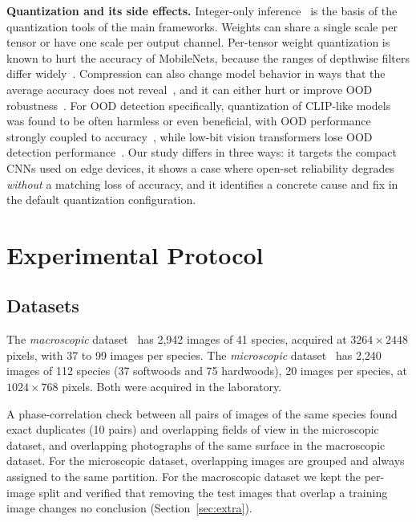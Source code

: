 \documentclass[conference]{IEEEtran}
\begin{document}
\textbf{Quantization and its side effects.} Integer-only inference~\cite{jacob2018quantization} is the basis of the quantization tools of the main frameworks. Weights can share a single scale per tensor or have one scale per output channel. Per-tensor weight quantization is known to hurt the accuracy of MobileNets, because the ranges of depthwise filters differ widely~\cite{krishnamoorthi2018quantizing,nagel2019dfq,nagel2021white}. Compression can also change model behavior in ways that the average accuracy does not reveal~\cite{hooker2019forget}, and it can either hurt or improve OOD robustness~\cite{diffenderfer2021winning}. For OOD detection specifically, quantization of CLIP-like models was found to be often harmless or even beneficial, with OOD performance strongly coupled to accuracy~\cite{bouguerra2025less}, while low-bit vision transformers lose OOD detection performance~\cite{kuang2026vit}. Our study differs in three ways: it targets the compact CNNs used on edge devices, it shows a case where open-set reliability degrades \emph{without} a matching loss of accuracy, and it identifies a concrete cause and fix in the default quantization configuration.

\section{Experimental Protocol}

\subsection{Datasets}

The \emph{macroscopic} dataset~\cite{paula2014forest} has 2,942 images of 41 species, acquired at $3264\times 2448$ pixels, with 37 to 99 images per species. The \emph{microscopic} dataset~\cite{martins2013database} has 2,240 images of 112 species (37 softwoods and 75 hardwoods), 20 images per species, at $1024\times 768$ pixels. Both were acquired in the laboratory.

A phase-correlation check between all pairs of images of the same species found exact duplicates (10 pairs) and overlapping fields of view in the microscopic dataset, and overlapping photographs of the same surface in the macroscopic dataset. For the microscopic dataset, overlapping images are grouped and always assigned to the same partition. For the macroscopic dataset we kept the per-image split and verified that removing the test images that overlap a training image changes no conclusion (Section~\ref{sec:extra}).
\end{document}
